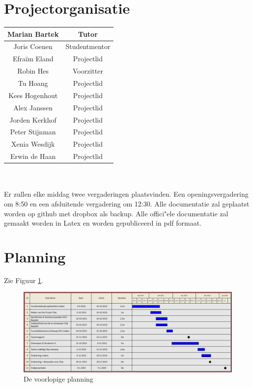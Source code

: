 \documentclass{scrartcl}
\begin{document}
\section{Projectorganisatie}
\begin {tabular}{|c|c|}
\hline
Marian Bartek & Tutor\\
\hline
Joris Coenen & Studentmentor\\
\hline
Efraïm Eland & Projectlid\\
\hline
Robin Hes & Voorzitter\\
\hline
Tu Hoang & Projectlid\\
\hline
Kees Hogenhout & Projectlid\\
\hline
Alex Janssen & Projectlid\\
\hline
Jorden Kerkhof & Projectlid\\
\hline
Peter Stijnman & Projectlid\\
\hline
Xenia Wesdijk & Projectlid\\
\hline
Erwin de Haan & Projectlid\\
\hline
\end {tabular}
\\
\\Er zullen elke middag twee vergaderingen plaatsvinden. Een openingsvergadering om 8:50 en een afsluitende vergadering om 12:30.
Alle documentatie zal geplaatst worden op github met dropbox als backup.
Alle offici"ele documentatie zal gemaakt worden in Latex en worden gepubliceerd in pdf formaat.
\newpage
\section{Planning}
Zie Figuur \ref{fig:planning}.
 \begin{figure}[H]
\centering
	\includegraphics[width=18cm]{Planner}
	\caption{De voorlopige planning}
	\label{fig:planning}
\end{figure}
\end{document}
